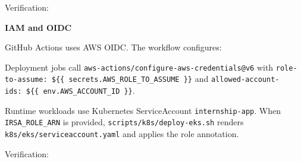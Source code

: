 Verification:

\begin{Shaded}
\begin{Highlighting}[]
\end{Highlighting}
\end{Shaded}

\vspace{0.5em}\noindent\textbf{IAM and OIDC}\par

GitHub Actions uses AWS OIDC. The workflow configures:

\begin{Shaded}
\begin{Highlighting}[]
\KeywordTok{:}
\AttributeTok{  }\KeywordTok{:}
\AttributeTok{  }\KeywordTok{:}
\end{Highlighting}
\end{Shaded}

Deployment jobs call \texttt{aws-\allowbreak{}actions/\allowbreak{}configure-\allowbreak{}aws-\allowbreak{}credentials@v6}
with
\texttt{role-\allowbreak{}to-\allowbreak{}assume:\ \$\{\{\ secrets.\allowbreak{}AWS\_\allowbreak{}ROLE\_\allowbreak{}TO\_\allowbreak{}ASSUME\ \}\}}
and \texttt{allowed-\allowbreak{}account-\allowbreak{}ids:\ \$\{\{\ env.\allowbreak{}AWS\_\allowbreak{}ACCOUNT\_\allowbreak{}ID\ \}\}}.

Runtime workloads use Kubernetes ServiceAccount \texttt{internship-\allowbreak{}app}.
When \texttt{IRSA\_\allowbreak{}ROLE\_\allowbreak{}ARN} is provided,
\texttt{scripts/\allowbreak{}k8s/\allowbreak{}deploy-\allowbreak{}eks.\allowbreak{}sh} renders
\texttt{k8s/\allowbreak{}eks/\allowbreak{}serviceaccount.\allowbreak{}yaml} and applies the role annotation.

Verification:

\begin{Shaded}
\begin{Highlighting}[]
\end{Highlighting}
\end{Shaded}

